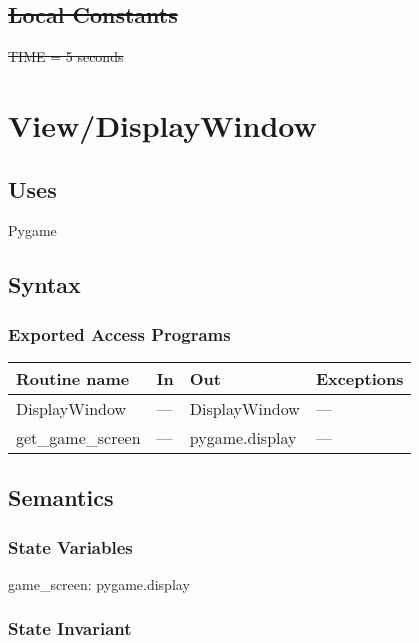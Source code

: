 \documentclass[12pt]{article}
\begin{document}
\subsection*{\sout{Local Constants}}
\sout{TIME = 5 seconds}\\
\newpage
\section*{View/DisplayWindow}

\subsection* {Uses}
Pygame

\subsection* {Syntax}

\subsubsection* {Exported Access Programs}

\begin{tabular}{| l | l | l | l |}
\hline
\textbf{Routine name} & \textbf{In} & \textbf{Out} & \textbf{Exceptions}\\
\hline
    DisplayWindow & --- & DisplayWindow & ---\\
\hline
    get\_game\_screen &--- & pygame.display & ---\\
\hline
\end{tabular}

\subsection* {Semantics}

\subsubsection* {State Variables}

game\_screen: pygame.display 

\subsubsection* {State Invariant}
\end{document}
